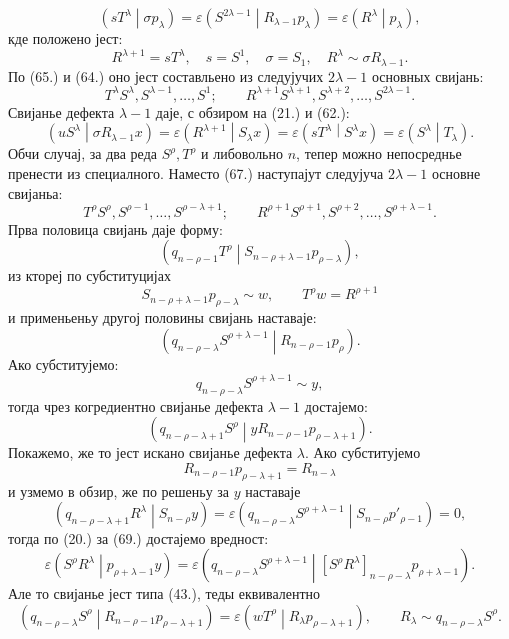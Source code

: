 ﻿\documentclass[11pt]{article}
\newcommand{\pair}[2]{\left(#1\middle|#2\right)}
\newcommand{\eps}{\varepsilon}
\begin{document}
\[
 \pair{sT^\lambda}{\sigma p_\lambda}
 =\eps\pair{S^{2\lambda-1}}{R_{\lambda-1}p_\lambda}
 =\eps\pair{R^\lambda}{p_\lambda},
\]
кде положено јест:
\[
 R^{\lambda+1}=sT^\lambda,
 \quad s=S^1,
 \quad \sigma=S_1,
 \quad R^\lambda\sim\sigma R_{\lambda-1}.
\]
По (65.) и (64.) оно јест составльено из следујучих $2\lambda-1$ основных свијань:
\begin{equation}
 T^\lambda S^\lambda,S^{\lambda-1},\ldots,S^1;
 \qquad R^{\lambda+1}S^{\lambda+1},S^{\lambda+2},\ldots,S^{2\lambda-1}.
\tag{67}
\end{equation}
Свијанье дефекта $\lambda-1$ даје, с обзиром на (21.) и (62.):
\[
 \pair{uS^\lambda}{\sigma R_{\lambda-1}x}=\eps\pair{R^{\lambda+1}}{S_\lambda x}
 =\eps\pair{sT^\lambda}{S^\lambda x}=\eps\pair{S^\lambda}{T_\lambda}.
\]
Обчи случај, за два реда $S^\rho,T^\rho$ и либовольно $n$, тепер можно непосреднье пренести из специалного. Наместо (67.) наступајут следујуча $2\lambda-1$ основне свијаньа:
\begin{equation}
 T^\rho S^\rho,S^{\rho-1},\ldots,S^{\rho-\lambda+1};
 \qquad R^{\rho+1}S^{\rho+1},S^{\rho+2},\ldots,S^{\rho+\lambda-1}.
\tag{68}
\end{equation}
Прва половица свијань даје форму:
\[
 \pair{q_{n-\rho-1}T^\rho}{S_{n-\rho+\lambda-1}p_{\rho-\lambda}},
\]
из ктореј по субституцијах
\[
 S_{n-\rho+\lambda-1}p_{\rho-\lambda}\sim w,
 \qquad T^\rho w=R^{\rho+1}
\]
и применьеньу другој половины свијань наставаје:
\[
 \pair{q_{n-\rho-\lambda}S^{\rho+\lambda-1}}{R_{n-\rho-1}p_\rho}.
\]
Ако субститујемо:
\[
 q_{n-\rho-\lambda}S^{\rho+\lambda-1}\sim y,
\]
тогда чрез когредиентно свијанье дефекта $\lambda-1$ достајемо:
\begin{equation}
 \pair{q_{n-\rho-\lambda+1}S^\rho}{yR_{n-\rho-1}p_{\rho-\lambda+1}}.
\tag{69}
\end{equation}
Покажемо, же то јест искано свијанье дефекта $\lambda$. Ако субститујемо
\[
 R_{n-\rho-1}p_{\rho-\lambda+1}=R_{n-\lambda}
\]
и узмемо в обзир, же по решеньу за $y$ наставаје
\[
 \pair{q_{n-\rho-\lambda+1}R^\lambda}{S_{n-\rho}y}
 =\eps\pair{q_{n-\rho-\lambda}S^{\rho+\lambda-1}}{S_{n-\rho}p'_{\rho-1}}=0,
\]
тогда по (20.) за (69.) достајемо вредност:
\[
 \eps\pair{S^\rho R^\lambda}{p_{\rho+\lambda-1}y}
 =\eps\pair{q_{n-\rho-\lambda}S^{\rho+\lambda-1}}{[S^\rho R^\lambda]_{n-\rho-\lambda}p_{\rho+\lambda-1}}.
\]
Але то свијанье јест типа (43.), теды еквивалентно
\[
 \pair{q_{n-\rho-\lambda}S^\rho}{R_{n-\rho-1}p_{\rho-\lambda+1}}
 =\eps\pair{wT^\rho}{R_\lambda p_{\rho-\lambda+1}},
 \qquad R_\lambda\sim q_{n-\rho-\lambda}S^\rho.
\]
\end{document}
